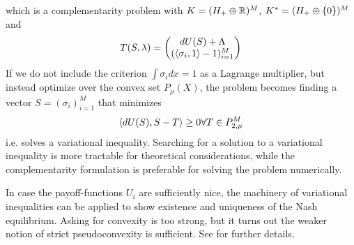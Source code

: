 which is a complementarity problem with $K = (H_+ \oplus \mathbb{R})^M$, $K^* = (H_+ \oplus \{0\})^M$ and
\begin{equation}
  T(S,\lambda)=\begin{pmatrix} dU(S) + \Lambda \\ (\left \langle \sigma_i,1 \right \rangle - 1)_{i=1}^M \end{pmatrix}
\end{equation}
If we do not include the criterion $\int \sigma_i dx = 1$ as a Lagrange multiplier, but instead optimize over the convex set $P_\mu(X)$, the problem  becomes finding a vector $S = (\sigma_i)_{i=1}^M$ that minimizes
\begin{equation}
  \left \langle dU(S),S-T \right \rangle \geq 0 \forall T\in P_{2,\mu}^M
\end{equation}
i.e. solves a variational inequality. Searching for a solution to a variational inequality is more tractable for theoretical considerations, while the complementarity formulation is preferable for solving the problem numerically.

In case the payoff-functions $U_i $ are sufficiently nice, the machinery of variational inequalities can be applied to show existence and uniqueness of the Nash equilibrium. Asking for convexity is too strong, but it turns out the weaker notion of strict pseudoconvexity is sufficient. See  for further details.

